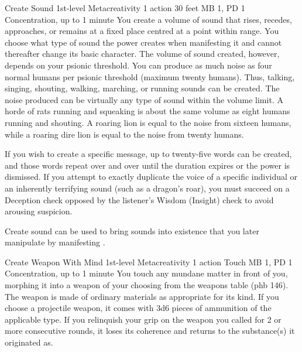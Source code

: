 \DndPowerHeader%
  {Create Sound}
  {1st-level Metacreativity}
  {1 action}
  {30 feet}
  {MB 1, PD 1}
  {Concentration, up to 1 minute}
  You create a volume of sound that rises, recedes, approaches,
  or remains at a fixed place centred at a point within range.
  You choose what type of sound the power creates when manifesting it
  and cannot thereafter change its basic character.
  The volume of sound created, however, depends on your psionic threshold.
  You can produce as much noise as four normal humans per psionic threshold
  (maximum twenty humans).
  Thus, talking, singing, shouting, walking,
  marching, or running sounds can be created.
  The noise produced can be virtually any type of sound within the volume limit.
  A horde of rats running and squeaking is about the same volume as eight humans
  running and shouting.
  A roaring lion is equal to the noise from sixteen humans,
  while a roaring dire lion is equal to the noise from twenty humans.

  If you wish to create a specific message,
  up to twenty-five words can be created,
  and those words repeat over and over until the duration expires
  or the power is dismissed.
  If you attempt to exactly duplicate the voice of a specific individual
  or an inherently terrifying sound
  (such as a dragon's roar),
  you must succeed on a Deception check opposed
  by the listener's Wisdom (Insight) check to avoid arousing suspicion.
  
  Create sound can be used to bring sounds into existence that you later
  manipulate by manifesting .

\DndPowerHeader%
  {Create Weapon With Mind}
  {1st-level Metacreativity}
  {1 action}
  {Touch}
  {MB 1, PD 1}
  {Concentration, up to 1 minute}
  You touch any mundane matter in front of you,
  morphing it into a weapon of your choosing
  from the weapons table (phb 146).
  The weapon is made of ordinary materials
  as appropriate for its kind.
  If you choose a projectile weapon,
  it comes with 3d6 pieces of ammunition
  of the applicable type.
  If you relinquish your grip on the weapon you called
  for 2 or more consecutive rounds,
  it loses its coherence and returns to the substance(s)
  it originated as.

